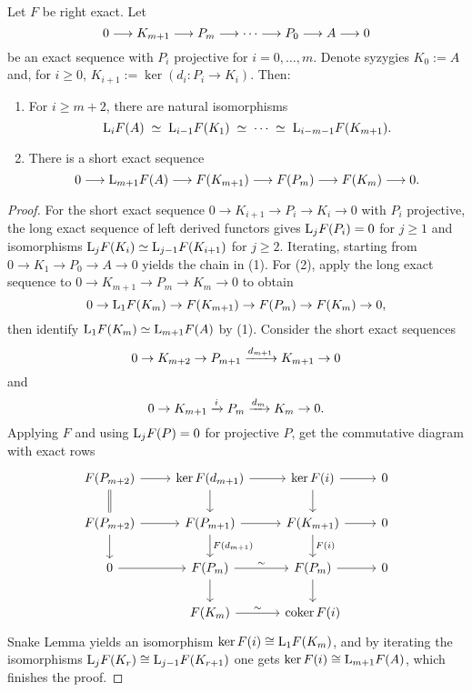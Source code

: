 
\begin{proposition*}
	Let \( F \) be right exact. Let
	\[
		0 \longrightarrow K_{m+1} \longrightarrow P_m \longrightarrow \dotsm \longrightarrow P_0 \longrightarrow A \longrightarrow 0
	\]
	be an exact sequence with \( P_i \) projective for \( i=0,\dots,m \). Denote syzygies \( K_0:=A \) and, for \( i\ge 0 \), \( K_{i+1}:=\ker(d_i: P_i\to K_i) \). Then:
	\begin{enumerate}
		\item For \( i\ge m+2 \), there are natural isomorphisms
			\[
				\mathrm L_i F(A)\;\simeq\; \mathrm L_{i-1}F(K_1)\;\simeq\; \dotsm\; \simeq\; \mathrm L_{i-m-1}F(K_{m+1}).
			\]
		\item There is a short exact sequence
			\[
				0 \longrightarrow \mathrm L_{m+1}F(A) \longrightarrow F(K_{m+1}) \longrightarrow F(P_m) \longrightarrow F(K_m) \longrightarrow 0.
			\]
	\end{enumerate}
\end{proposition*}

\begin{proof}
	For the short exact sequence \( 0\to K_{i+1}\to P_i\to K_i\to 0 \) with \( P_i \) projective, the long exact sequence of left derived functors gives \( \mathrm L_jF(P_i)=0 \) for \( j\ge 1 \) and isomorphisms \( \mathrm L_jF(K_i)\simeq \mathrm L_{j-1}F(K_{i+1}) \) for \( j\ge 2 \). Iterating, starting from \( 0\to K_1\to P_0\to A\to 0 \) yields the chain in (1). For (2), apply the long exact sequence to \( 0\to K_{m+1}\to P_m\to K_m\to 0 \) to obtain
	\[
		0 \to \mathrm L_1F(K_m) \to F(K_{m+1}) \to F(P_m) \to F(K_m) \to 0,
	\]
	then identify \( \mathrm L_1F(K_m) \simeq \mathrm L_{m+1}F(A) \) by (1). Consider the short exact sequences
	\[
		0 \to K_{m+2} \to P_{m+1} \xrightarrow{d_{m+1}} K_{m+1} \to 0
	\]
	and
	\[
		0 \to K_{m+1}\xrightarrow{i} P_m\xrightarrow{d_m} K_m \to 0.
	\]
	Applying \( F \) and using \( \mathrm L_jF(P)=0 \) for projective \( P \), get the commutative diagram with exact rows
	\[
		\begin{tikzcd}
			F(P_{m+2}) \arrow[r] \arrow[d, equals] & \ker F(d_{m+1}) \arrow[r] \arrow[d] & \ker F(i) \arrow[r] \arrow[d] & 0 \\
			F(P_{m+2}) \arrow[r] \arrow[d] & F(P_{m + 1}) \arrow[d,"F(d_{m + 1})"] \arrow[r] & F(K_{m + 1}) \arrow[r] \arrow[d, "F(i)"] & 0 \\
			0 \arrow[r] & F(P_m) \arrow[r,"\sim"] \arrow[d] & F(P_m) \arrow[r] \arrow[d] & 0 \\
			& F(K_m) \arrow[r,"\sim"] & \coker F(i)
		\end{tikzcd}
	\]
	Snake Lemma yields an isomorphism \( \ker F(i)\cong \mathrm L_1F(K_m) \), and by iterating the isomorphisms \( \mathrm L_jF(K_r)\cong \mathrm L_{j-1}F(K_{r+1}) \) one gets \( \ker F(i)\cong \mathrm L_{m+1}F(A) \), which finishes the proof.\qedhere
\end{proof}

